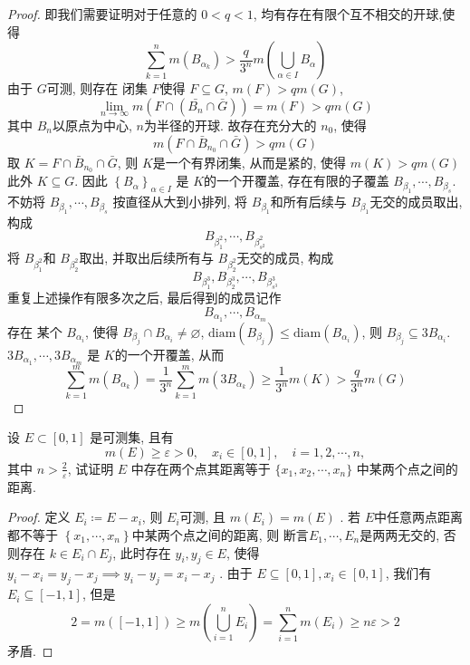 \documentclass[../main.tex]{subfiles}
\begin{document}
\begin{proof}
    即我们需要证明对于任意的 \(  0< q< 1  \), 均有存在有限个互不相交的开球,使得 \[
    \sum _{k= 1}^{n}m\left( B_{\alpha _{k}} \right) > \frac{q }{3^{n} }m\left( \bigcup _{\alpha \in I}B_{\alpha } \right)  
    \] 由于 \(  G  \)可测, 则存在 闭集 \(  F  \)使得 \(  F\subseteq G  \), \(  m\left( F \right)> q m\left( G \right)    \),     \[
    \lim_{n\to \infty}m\left( F\cap \left( \bar{B_{n}} \cap \bar{G} \right) \right) = m\left( F \right)> qm\left( G \right)   
    \]其中 \(  B_{n}  \)以原点为中心, \(  n  \)为半径的开球.  故存在充分大的 \(  n_0  \), 使得 \[
    m\left( F\cap \bar{B}_{n_0}\cap  \bar{G} \right)> qm\left( G \right)  
    \]取 \(  K= F\cap  \bar{B}_{n_0} \cap  \bar{G} \), 则 \(  K  \)是一个有界闭集, 从而是紧的, 使得 \(  m\left( K \right)> q m\left( G \right)    \)  此外 \(  K\subseteq G  \). 因此    \(  \left\{ B_{\alpha } \right\}_{\alpha \in I}  \) 是 \(  K  \)的一个开覆盖, 存在有限的子覆盖 \(  B_{\beta  _1 },\cdots ,B_{\beta _{s}}  \). 不妨将 \(  B_{\beta _1 },\cdots ,B_{\beta _{s}}  \) 按直径从大到小排列, 将 \(  B_{\beta _1 }  \)和所有后续与 \(  B_{\beta _1 }  \)无交的成员取出, 构成 \[
    B_{\beta ^{2}_{1}},\cdots ,B_{\beta ^{2} _{s^{2}}}
    \]  将 \(  B_{\beta _1 ^{2}}  \)和 \(  B_{\beta _2 ^{2}}  \)取出, 并取出后续所有与 \(  B_{\beta _2 ^{2}}  \)无交的成员, 构成 \[
    B_{\beta _1 ^{3}}, B_{\beta _{2}^{3}},\cdots , B_{\beta ^{3}_{s^{3}}}
    \]   重复上述操作有限多次之后, 最后得到的成员记作 \[
    B_{\alpha _1 },\cdots ,B_{\alpha _{m}}
    \]  存在 某个 \( B_{\alpha _{i}} \), 使得   \(  B_{\beta _{j}}\cap B_{\alpha _{i}} \neq \varnothing  \),  \(  \mathrm{diam}\left( B_{\beta _{j}} \right)\le \mathrm{diam}\left(B_{\alpha _{i}} \right)    \), 则 \(  B_{\beta _{j}}\subseteq 3B_{\alpha _{i}}   \).   \(  3B_{\alpha _1 },\cdots ,3B_{\alpha _{m}}  \) 是 \(  K  \)的一个开覆盖, 从而 \[
    \sum _{k = 1}^{m}m\left( B_{\alpha _{k}} \right)= \frac{1 }{3^{n} }\sum _{k = 1}^{m}m\left( 3B_{\alpha _{k}} \right)\ge \frac{1 }{3^{n} }m\left( K \right)> \frac{q }{3^{n} }m\left( G \right)       
    \] 
\end{proof}
\begin{exercise}{}{}
设 $E \subset [0,1]$ 是可测集, 且有
\[m(E) \ge \varepsilon > 0, \quad x_i \in [0,1], \quad i=1,2,\cdots,n,\]
其中 $n > \frac{2}{\varepsilon}$, 试证明 $E$ 中存在两个点其距离等于 $\{x_1, x_2, \cdots, x_n\}$ 中某两个点之间的距离.
\end{exercise}
\begin{proof}
  定义 \(  E_{i}\coloneqq E-x_{i}  \), 则 \(  E_{i}  \)可测, 且 \(  m\left( E_{i} \right)= m\left( E \right)    \)   . 若 \(  E  \)中任意两点距离都不等于 \(  \left\{  x_1,\cdots,x_n  \right\}  \)中某两个点之间的距离, 则 断言\(  E_1,\cdots ,E_{n}  \)是两两无交的, 否则存在 \( k \in E_{i}\cap E_{j} \), 此时存在 \(y_{i},y_{j}\in E \), 使得  \(  y_{i}-x_{i}= y_{j}-x_{j}\implies y_{i}-y_{j}= x_{i}-x_{j}  \)  .   由于 \(  E\subseteq \left[ 0,1 \right], x_{i}\in \left[ 0,1 \right]    \), 我们有 \( E_{i}\subseteq \left[ -1,1 \right]   \), 但是 \[
  2= m\left( \left[ -1,1 \right]  \right)\ge m\left( \bigcup _{i= 1}^{n}E_{i} \right)  = \sum _{i = 1}^{n}m\left( E_{i} \right)\ge n \varepsilon > 2 
  \]矛盾.  
\end{proof}
\end{document}
